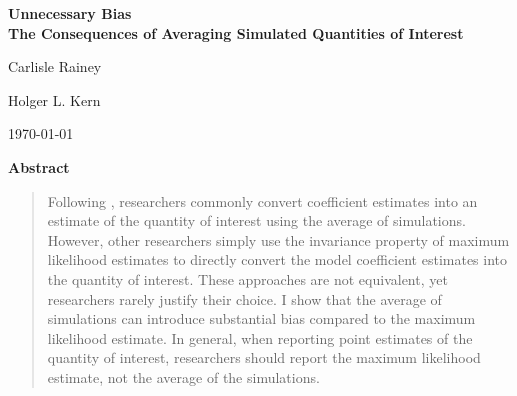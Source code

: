 \documentclass[11pt]{article}
\begin{document}
\begin{center}

{\LARGE \textbf{Unnecessary Bias}}\\\vspace{2mm}
{ \textbf{The Consequences of Averaging Simulated Quantities of Interest}}

\vspace{5mm}

Carlisle Rainey

\vspace{5mm}

Holger L. Kern

\vspace{1cm}

\today
\end{center}

\vspace{5mm}

{\centerline{\textbf{Abstract}}}
\begin{quote}\noindent
Following \cite{KingTomzWittenberg2000}, researchers commonly convert coefficient estimates into an estimate of the quantity of interest using the average of simulations.
However, other researchers simply use the invariance property of maximum likelihood estimates to directly convert the model coefficient estimates into the quantity of interest.
These approaches are not equivalent, yet researchers rarely justify their choice.
I show that the average of simulations can introduce substantial bias compared to the maximum likelihood estimate.
In general, when reporting point estimates of the quantity of interest, researchers should report the maximum likelihood estimate, not the average of the simulations.
 \end{quote}


\end{document}
